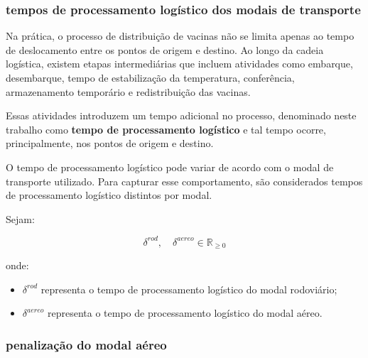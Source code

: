 

\subsubsection{tempos de processamento logístico dos modais de transporte}

Na prática, o processo de distribuição de vacinas não se limita apenas ao tempo de deslocamento entre os pontos de origem e destino. Ao longo da cadeia logística, existem etapas intermediárias que incluem atividades como embarque, desembarque, tempo de estabilização da temperatura, conferência, armazenamento temporário e redistribuição das vacinas.

Essas atividades introduzem um tempo adicional no processo, denominado neste trabalho como \textbf{tempo de processamento logístico} e tal tempo ocorre, principalmente, nos pontos de origem e destino.

O tempo de processamento logístico pode variar de acordo com o modal de transporte utilizado. Para capturar esse comportamento, são considerados tempos de processamento logístico distintos por modal.

Sejam:

\[
\delta^{rod}, \quad \delta^{aereo} \in \mathbb{R}_{\geq 0}
\]

onde:
\begin{itemize}
    \item $\delta^{rod}$ representa o tempo de processamento logístico do modal rodoviário;
    \item $\delta^{aereo}$ representa o tempo de processamento logístico do modal aéreo.
\end{itemize}

\subsubsection{penalização do modal aéreo}

